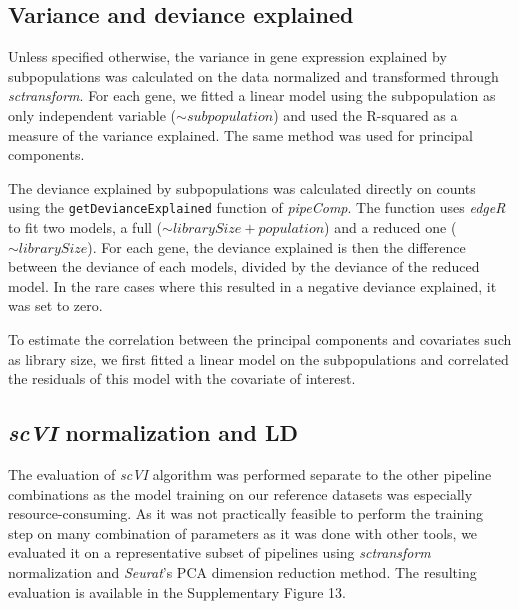 \documentclass[11pt]{article}
\begin{document}
\subsection*{Variance and deviance explained}

Unless specified otherwise, the variance in gene expression explained by subpopulations was calculated on the data normalized and transformed through \textit{sctransform}. For each gene, we fitted a linear model using the subpopulation as only independent variable ($\sim subpopulation$) and used the R-squared as a measure of the variance explained. The same method was used for principal components.

The deviance explained by subpopulations was calculated directly on counts using the \linebreak \texttt{getDevianceExplained} function of \textit{pipeComp}. The function uses \textit{edgeR} to fit two models, a full ($\sim librarySize + population$) and a reduced one ($\sim librarySize$). For each gene, the deviance explained is then the difference between the deviance of each models, divided by the deviance of the reduced model. In the rare cases where this resulted in a negative deviance explained, it was set to zero.

To estimate the correlation between the principal components and covariates such as library size, we first fitted a linear model on the subpopulations and correlated the residuals of this model with the covariate of interest.

\subsection*{\textit{scVI} normalization and LD}

The evaluation of \textit{scVI} algorithm was performed separate to the other pipeline combinations as the model training on our reference datasets was especially resource-consuming. As it was not practically feasible to perform the training step on many combination of parameters as it was done with other tools, we evaluated it on a representative subset of pipelines using \textit{sctransform} normalization and \textit{Seurat}'s PCA dimension reduction method. The resulting evaluation is available in the Supplementary Figure 13. 
\end{document}

